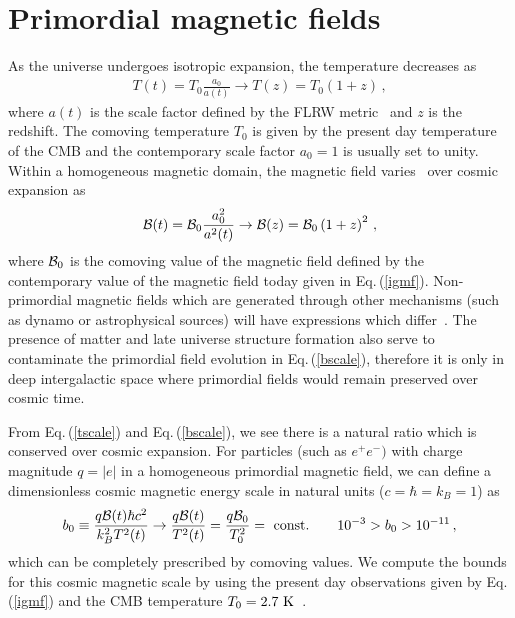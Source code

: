 \documentclass[a4paper]{article}
\newcommand{\req}[1]{Eq.\,(\ref{#1})}
\begin{document}
\section{Primordial magnetic fields}
\label{sec:primordial}
\noindent As the universe undergoes isotropic expansion, the temperature decreases as 
\begin{align}
    \label{tscale}
    T(t)=T_{0}\frac{a_{0}}{a(t)}\rightarrow T(z)=T_{0}(1+z)\,,
\end{align}
where $a(t)$ is the scale factor defined by the FLRW metric~\cite{weinberg1972gravitation} and $z$ is the redshift. The comoving temperature $T_{0}$ is given by the present day temperature of the CMB and the contemporary scale factor $a_{0}=1$ is usually set to unity. Within a homogeneous magnetic domain, the magnetic field varies~\cite{durrer2013cosmological} over cosmic expansion as
\begin{align}
    \label{bscale}
    {\cal B}(t)={\cal B}_{0}\frac{a_{0}^{2}}{a^{2}(t)}\rightarrow{\cal B}(z)={\cal B}_{0}\left(1+z\right)^{2}\,,
\end{align}
where ${\cal B}_{0}$ is the comoving value of the magnetic field defined by the contemporary value of the magnetic field today given in \req{igmf}. Non-primordial magnetic fields which are generated through other mechanisms (such as dynamo or astrophysical sources) will have expressions which differ~\cite{pomakov2022redshift}. The presence of matter and late universe structure formation also serve to contaminate the primordial field evolution in \req{bscale}, therefore it is only in deep intergalactic space where primordial fields would remain preserved over cosmic time.

From \req{tscale} and \req{bscale}, we see there is a natural ratio which is conserved over cosmic expansion. For particles (such as $e^{+}e^{-})$ with charge magnitude $q=|e|$ in a homogeneous primordial magnetic field, we can define a dimensionless cosmic magnetic energy scale in natural units ($c=\hbar=k_{B}=1$) as
\begin{align}
    \label{tbscale}
    b_{0}\equiv\frac{q{\cal B}(t)\hbar c^{2}}{k_{B}^{2}T^{2}(t)}\rightarrow\frac{q{\cal B}(t)}{T^{2}(t)}=\frac{q{\cal B}_{0}}{T_{0}^{2}}={\rm\ const.}\qquad10^{-3}>b_{0}>10^{-11}\,,
\end{align}
which can be completely prescribed by comoving values. We compute the bounds for this cosmic magnetic scale by using the present day observations given by \req{igmf} and the CMB temperature $T_{0}=2.7{\rm\ K}$~\cite{aghanim2018planck}.
\end{document}

